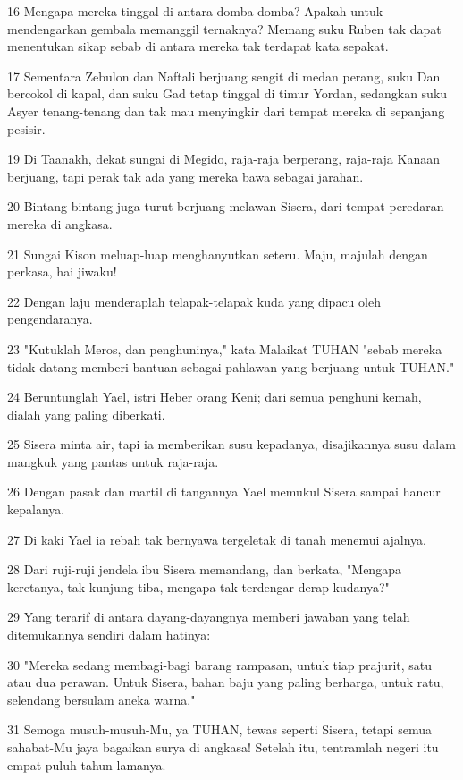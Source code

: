 \par 16 Mengapa mereka tinggal di antara domba-domba? Apakah untuk mendengarkan gembala memanggil ternaknya? Memang suku Ruben tak dapat menentukan sikap sebab di antara mereka tak terdapat kata sepakat.
\par 17 Sementara Zebulon dan Naftali berjuang sengit di medan perang, suku Dan bercokol di kapal, dan suku Gad tetap tinggal di timur Yordan, sedangkan suku Asyer tenang-tenang dan tak mau menyingkir dari tempat mereka di sepanjang pesisir.
\par 19 Di Taanakh, dekat sungai di Megido, raja-raja berperang, raja-raja Kanaan berjuang, tapi perak tak ada yang mereka bawa sebagai jarahan.
\par 20 Bintang-bintang juga turut berjuang melawan Sisera, dari tempat peredaran mereka di angkasa.
\par 21 Sungai Kison meluap-luap menghanyutkan seteru. Maju, majulah dengan perkasa, hai jiwaku!
\par 22 Dengan laju menderaplah telapak-telapak kuda yang dipacu oleh pengendaranya.
\par 23 "Kutuklah Meros, dan penghuninya," kata Malaikat TUHAN "sebab mereka tidak datang memberi bantuan sebagai pahlawan yang berjuang untuk TUHAN."
\par 24 Beruntunglah Yael, istri Heber orang Keni; dari semua penghuni kemah, dialah yang paling diberkati.
\par 25 Sisera minta air, tapi ia memberikan susu kepadanya, disajikannya susu dalam mangkuk yang pantas untuk raja-raja.
\par 26 Dengan pasak dan martil di tangannya Yael memukul Sisera sampai hancur kepalanya.
\par 27 Di kaki Yael ia rebah tak bernyawa tergeletak di tanah menemui ajalnya.
\par 28 Dari ruji-ruji jendela ibu Sisera memandang, dan berkata, "Mengapa keretanya, tak kunjung tiba, mengapa tak terdengar derap kudanya?"
\par 29 Yang terarif di antara dayang-dayangnya memberi jawaban yang telah ditemukannya sendiri dalam hatinya:
\par 30 "Mereka sedang membagi-bagi barang rampasan, untuk tiap prajurit, satu atau dua perawan. Untuk Sisera, bahan baju yang paling berharga, untuk ratu, selendang bersulam aneka warna."
\par 31 Semoga musuh-musuh-Mu, ya TUHAN, tewas seperti Sisera, tetapi semua sahabat-Mu jaya bagaikan surya di angkasa! Setelah itu, tentramlah negeri itu empat puluh tahun lamanya.

